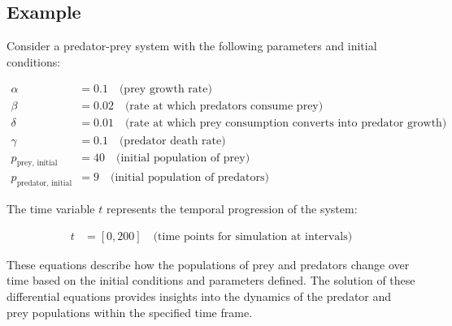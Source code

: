 \subsection{Example}

Consider a predator-prey system with the following parameters and initial conditions:

\begin{align*}
    \alpha &= 0.1 \quad \text{(prey growth rate)} \\
    \beta &= 0.02 \quad \text{(rate at which predators consume prey)} \\
    \delta &= 0.01 \quad \text{(rate at which prey consumption converts into predator growth)} \\
    \gamma &= 0.1 \quad \text{(predator death rate)} \\
    p_{\text{prey, initial}} &= 40 \quad \text{(initial population of prey)} \\
    p_{\text{predator, initial}} &= 9 \quad \text{(initial population of predators)}
\end{align*}

The time variable $t$ represents the temporal progression of the system:

\begin{align*}
    t &= [0, 200] \quad \text{(time points for simulation at intervals)}
\end{align*}

These equations describe how the populations of prey and predators change over time based on the initial conditions and parameters defined. The solution of these differential equations provides insights into the dynamics of the predator and prey populations within the specified time frame.